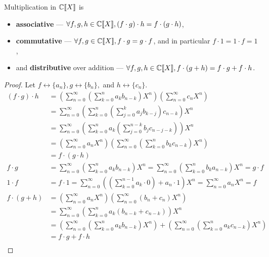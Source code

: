 \documentclass[a4paper, 12pt]{report}
\begin{document}
\begin{prop}\label{prop:gf-mult-properties}
Multiplication in $\mathbb{C}\llbracket X \rrbracket$ is \begin{itemize}
\item \textbf{associative} --- $\forall f, g, h \in \mathbb{C}\llbracket X \rrbracket, (f \cdot g) \cdot h = f \cdot (g \cdot h)$,
\item \textbf{commutative} --- $\forall f, g \in \mathbb{C}\llbracket X \rrbracket, f \cdot g = g \cdot f$, and in particular $f \cdot 1 = 1 \cdot f = 1$,
\item and \textbf{distributive} over addition --- $\forall f, g, h \in \mathbb{C}\llbracket X \rrbracket, f \cdot (g + h) = f \cdot g + f \cdot h$.
\end{itemize}
\end{prop}
\begin{proof}
Let $f \longleftrightarrow \{a_n\}, g \longleftrightarrow \{b_n\},$ and $h \longleftrightarrow \{c_n\}$.
\begin{align*}
(f \cdot g) \cdot h 
&= \left(\sum_{n = 0}^\infty \left(\sum_{k = 0}^n a_k b_{n - k}\right) X^n\right) \left(\sum_{n = 0}^\infty c_n X^n\right)\\
&= \sum_{n = 0}^\infty \left(\sum_{k = 0}^n \left(\sum_{j = 0}^k a_j b_{k - j} \right) c_{n - k}\right) X^n\\
&= \sum_{n = 0}^\infty \left(\sum_{k = 0}^n a_k \left(\sum_{j = 0}^{n - k} b_{j} c_{n - j - k}\right)\right) X^n\\
&= \left(\sum_{n = 0}^\infty a_n X^n\right) \left(\sum_{n = 0}^\infty \left(\sum_{k = 0}^n b_k c_{n - k}\right) X^n \right)\\
&= f \cdot (g \cdot h)\\
f \cdot g 
&= \sum_{n = 0}^\infty \left(\sum_{k = 0}^n a_k b_{n - k} \right) X^n
= \sum_{n = 0}^\infty \left(\sum_{k = 0}^n b_k a_{n - k} \right) X^n
= g \cdot f\\
1 \cdot f
&= f \cdot 1
= \sum_{n = 0}^\infty \left(\left(\sum_{k = 0}^{n - 1} a_k \cdot 0\right) + a_n \cdot 1\right) X^n
= \sum_{n = 0}^\infty a_n X^n
= f\\
f \cdot (g + h)
&= \left(\sum_{n = 0}^\infty a_n X^n\right)\left(\sum_{n = 0}^\infty (b_n + c_n) X^n\right)\\
&= \sum_{n = 0}^\infty \left(\sum_{k = 0}^n a_k (b_{n - k} + c_{n - k})\right) X^n\\
&=\left(\sum_{n = 0}^\infty \left(\sum_{k = 0}^n a_k b_{n - k}\right) X^n\right) 
+ \left(\sum_{n = 0}^\infty \left(\sum_{k = 0}^n a_k c_{n - k}\right) X^n\right)\\
&= f \cdot g + f \cdot h\\
\end{align*}
\end{proof}
\end{document}
